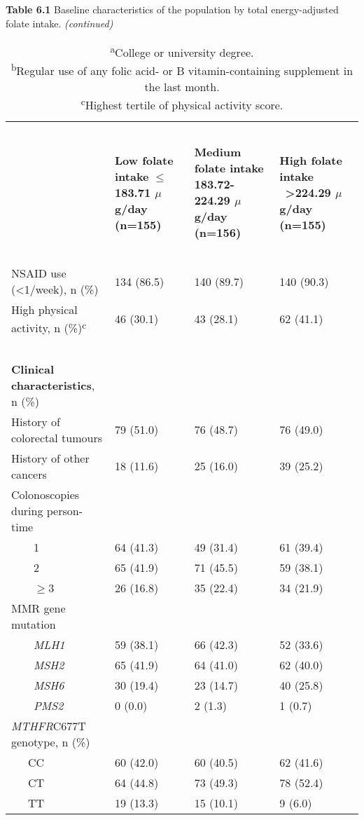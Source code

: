 \begin{table}
\caption*{\textbf{Table 6.1} Baseline characteristics of the population by total energy-adjusted folate intake. \emph{(continued)}}
\begin{adjustbox}{width=\textwidth}
\begin{tabular}{L{4.8cm}C{3.5cm}C{3.5cm}C{3.5cm}}
\hline
~ & ~ & ~ & ~\\
~ & {\bfseries Low folate intake} {\bfseries ${\leq}$183.71 $\mu$g/day} \bfseries (n=155) & {\bfseries Medium folate intake} \bfseries 183.72-224.29 $\mu$g/day (n=156) & {\bfseries High folate intake} \ {\bfseries {\textgreater}224.29 $\mu$g/day} \bfseries (n=155)\\
~ & ~ & ~ & ~\\
\hline

 NSAID use ({\textless}1/week), n (\%) & 134 (86.5) & 140 (89.7) & 140 (90.3)\\
{High physical activity, n (\%)}{\textsuperscript{c}} & 46 (30.1) & 43 (28.1) & 62 (41.1)\\
~ & ~ & ~ & ~\\
{\textbf{Clinical characteristics}}{, n (\%)} & ~ & ~ & ~ \\
{History of colorectal tumours} & 79 (51.0) & 76 (48.7) & 76 (49.0)\\
 History of other cancers & 18 (11.6) & 25 (16.0) & 39 (25.2)\\
 Colonoscopies during person-time & ~ & ~ & ~ \\
 \ \ \ \ 1 & 64 (41.3) & 49 (31.4) & 61 (39.4)\\
 \ \ \ \ 2 & 65 (41.9) & 71 (45.5) & 59 (38.1)\\
 \ \ \ \ ${\geq}$3 & 26 (16.8) & 35 (22.4) & {34 (21.9)}\\
 MMR gene mutation & ~ & ~ & ~ \\
 \ \ \ \ \emph{MLH1} & 59 (38.1) & 66 (42.3) & 52 (33.6)\\
 \ \ \ \ \emph{MSH2} \ \ & 65 (41.9) & 64 (41.0) & 62 (40.0)\\
 \ \ \ \ \emph{MSH6} & 30 (19.4) & 23 (14.7) & 40 (25.8)\\
 \ \ \ \ \emph{PMS2} & 0 (0.0) & 2 (1.3) & 1 (0.7)\\
{\textit{MTHFR}}{C677T genotype, n (\%)} & ~ & ~ & ~ \\
 \ \ \ CC & 60 (42.0) & 60 (40.5) & 62 (41.6)\\
 \ \ \ CT & 64 (44.8) & 73 (49.3) & 78 (52.4)\\
 \ \ \ TT & 19 (13.3) & 15 (10.1) & 9 (6.0)\\
\hline
\end{tabular}
\end{adjustbox}
\caption*{\footnotesize{\textsuperscript{a}College or university degree.\\\textsuperscript{b}Regular use of any folic acid- or B vitamin-containing supplement in the last month.\\\textsuperscript{c}Highest tertile of physical activity score.}}
\end{table}

